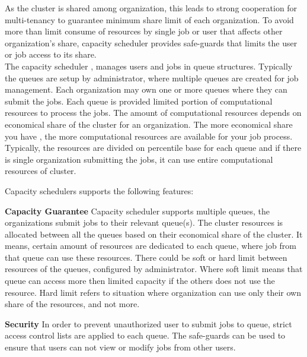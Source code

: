  As the cluster is shared among organization, this leads to strong cooperation for multi-tenancy to guarantee minimum share limit of each organization. To avoid more than limit consume of resources  by single job or user that affects other organization's share, capacity scheduler provides safe-guards that limits the user or job access to its share.\\
 
  The capacity scheduler , manages users and jobs in queue structures. Typically the queues are setup by administrator, where multiple queues are created for job management. Each organization may own one or more queues where they can submit the jobs. Each queue is provided limited portion of computational resources to process the jobs. The amount of computational resources depends on economical share of the cluster for an organization. The more economical share you have , the more computational resources are available for your job process.  Typically, the resources are divided on percentile base for each queue and if there is single organization submitting the jobs, it can use entire computational resources of cluster. 
 
 
 Capacity schedulers supports the following features:
 

 

 \textbf{Capacity Guarantee} Capacity scheduler supports multiple queues, the organizations submit jobs to their relevant queue(s). The cluster resources is allocated between all the queues based on their economical share of the cluster. It means, certain amount of resources are dedicated to each queue, where job from that queue can use these resources. There could be soft or hard limit between resources of the queues, configured by administrator. Where soft limit means that queue can access more then limited capacity if the others does not use the resource. Hard limit refers to situation where organization can use only their own share of the resources, and not more. 


 
 \textbf{Security} In order to prevent unauthorized user to submit jobs to queue, strict access control lists are applied to each queue. The safe-guards can be used to ensure that users can not view or modify jobs from other users.   
 

